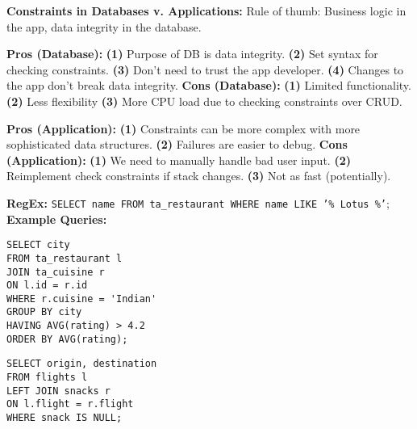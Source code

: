 \documentclass{report}
\renewcommand{\bf}[1]{\textbf{{#1}}}
\renewcommand{\tt}[1]{\texttt{{#1}}}
\begin{document}
\bf{Constraints in Databases v. Applications:} Rule of thumb: Business logic in the app, data
integrity in the database.
\vspace{-1em}
\begin{multicols}{2}
\bf{Pros (Database):}
\hfil \newline
\bf{(1)} Purpose of DB is data integrity.
\hfil \newline
\bf{(2)} Set syntax for checking constraints.
\hfil \newline
\bf{(3)} Don't need to trust the app developer.
\hfil \newline
\bf{(4)} Changes to the app don't break data integrity.
\hfil \newline
\bf{Cons (Database):}
\hfil \newline
\bf{(1)} Limited functionality.
\hfil \newline
\bf{(2)} Less flexibility
\hfil \newline
\bf{(3)} More CPU load due to checking constraints over CRUD.
\columnbreak

\bf{Pros (Application):}
\hfil \newline
\bf{(1)} Constraints can be more complex with more sophisticated data structures.
\hfil \newline
\bf{(2)} Failures are easier to debug.
\hfil \newline
\bf{Cons (Application):}
\hfil \newline
\bf{(1)} We need to manually handle bad user input.
\hfil \newline
\bf{(2)} Reimplement check constraints if stack changes.
\hfil \newline
\bf{(3)} Not as fast (potentially).
\end{multicols}
\vspace{-1em}
\bf{RegEx:} \tt{SELECT name FROM ta\_restaurant WHERE name LIKE '\% Lotus \%'};
\hfil \newline
\bf{Example Queries:}
\vspace{-1em}
\begin{multicols}{2}
    \begin{verbatim}
SELECT city
FROM ta_restaurant l
JOIN ta_cuisine r
ON l.id = r.id
WHERE r.cuisine = 'Indian'
GROUP BY city
HAVING AVG(rating) > 4.2
ORDER BY AVG(rating);
    \end{verbatim}
    \columnbreak

    \begin{verbatim}
SELECT origin, destination
FROM flights l
LEFT JOIN snacks r
ON l.flight = r.flight
WHERE snack IS NULL;
    \end{verbatim}
\end{multicols}
\end{document}
